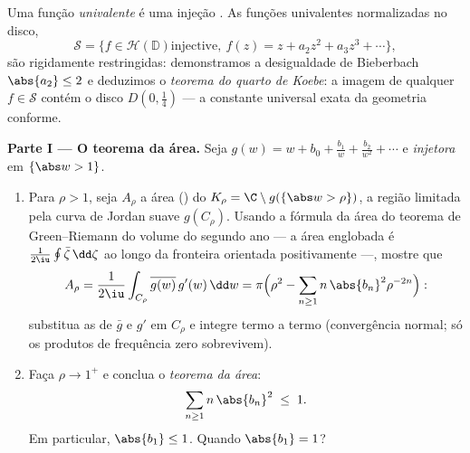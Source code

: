 \begin{problem}\label{pb:b3:conformal:1}
Uma função \emph{univalente} é uma injeção . As funções
univalentes normalizadas no disco,
\[
\mathcal S = \bigl\{f \in \mathcal H(\mathbb D) \text{
injective},\ f(z) = z + a_2z^2 + a_3z^3 + \cdots\bigr\},
\]
são rigidamente restringidas: demonstramos a desigualdade de Bieberbach
$\abs{a_2} \leq 2$ e deduzimos o \emph{teorema do quarto de Koebe}: a imagem de
qualquer $f \in \mathcal S$ contém o disco $D(0, \frac14)$ --- a constante universal exata da
geometria conforme.

\medskip
\noindent\textbf{Parte I --- O teorema da área.} Seja $g(w) = w
+ b_0 + \frac{b_1}w + \frac{b_2}{w^2} + \cdots$  e
\emph{injetora} em $\{\abs w > 1\}$.
\begin{enumerate}
  \item Para $\rho > 1$, seja $A_\rho$ a área () do
         $K_\rho = \C\setminus
        g(\{\abs w > \rho\})$, a região limitada pela curva de Jordan suave
        $g(C_\rho)$. Usando a fórmula da área do teorema de Green--Riemann do
        volume do segundo ano --- a área englobada é $\frac1{2\iu}
        \oint\bar\zeta\,\dd\zeta$ ao longo da
        fronteira orientada positivamente ---, mostre que
        \[
        A_\rho = \frac{1}{2\iu}\int_{C_\rho}
        \overline{g(w)}\,g'(w)\,\dd w
        = \pi\Bigl(\rho^2 -
        \sum_{n\geq1}n\,\abs{b_n}^2\rho^{-2n}\Bigr) :
        \]
        substitua as  de $\bar g$ e $g'$ em
        $C_\rho$ e integre termo a termo (convergência normal; só os
        produtos de frequência zero sobrevivem).
  \item Faça $\rho \to 1^+$ e conclua o \emph{teorema da área}:
        \[
        \sum_{n\geq1}n\,\abs{b_n}^2 \;\leq\; 1 .
        \]
        Em particular, $\abs{b_1} \leq 1$. Quando $\abs{b_1}
        = 1$?
\end{enumerate}


\end{problem}
